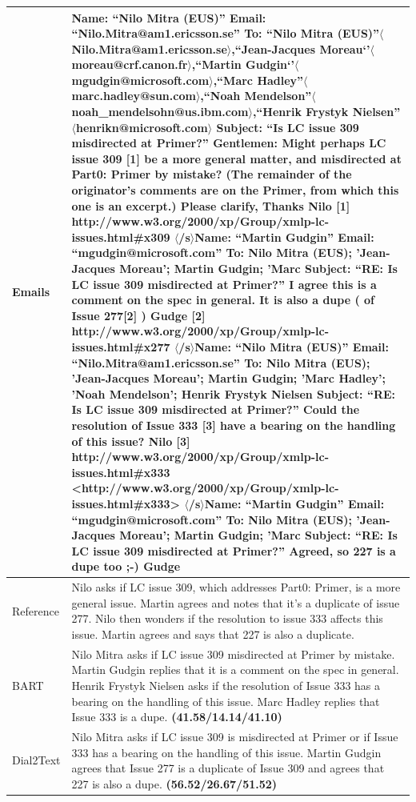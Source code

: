 \documentclass[letterpaper]{article} %
\begin{document}
\begin{table}
	\centering
	\small
	\begin{tabular}{p{1.5cm}p{14.5cm}}
		\toprule[1pt]
		Emails & Name: ``Nilo Mitra (EUS)''   Email: ``Nilo.Mitra@am1.ericsson.se''   To: ``Nilo Mitra (EUS)''$\langle$Nilo.Mitra@am1.ericsson.se$\rangle$,``Jean-Jacques Moreau‘’$\langle$moreau@crf.canon.fr$\rangle$,``Martin Gudgin‘’$\langle$mgudgin@microsoft.com$\rangle$,``Marc Hadley''$\langle$marc.hadley@sun.com$\rangle$,``Noah Mendelson''$\langle$noah\_mendelsohn@us.ibm.com$\rangle$,``Henrik Frystyk Nielsen''$\langle$henrikn@microsoft.com$\rangle$   Subject: ``Is LC issue 309 misdirected at Primer?''            Gentlemen:   Might perhaps LC issue 309 [1] be a more general matter, and misdirected at Part0: Primer by mistake? (The remainder of the originator's comments are on the Primer, from which this one is an excerpt.)   Please clarify,   Thanks   Nilo   [1] http://www.w3.org/2000/xp/Group/xmlp-lc-issues.html\#x309              $\langle$/s$\rangle$Name: ``Martin Gudgin''   Email: ``mgudgin@microsoft.com''   To: Nilo Mitra (EUS); 'Jean-Jacques Moreau'; Martin Gudgin; 'Marc   Subject: ``RE: Is LC issue 309 misdirected at Primer?''            I agree this is a comment on the spec in general. It is also a dupe ( of   Issue 277[2] )       Gudge       [2] http://www.w3.org/2000/xp/Group/xmlp-lc-issues.html\#x277    $\langle$/s$\rangle$Name: ``Nilo Mitra (EUS)''   Email: ``Nilo.Mitra@am1.ericsson.se''   To: Nilo Mitra (EUS); 'Jean-Jacques Moreau'; Martin Gudgin; 'Marc Hadley'; 'Noah Mendelson'; Henrik Frystyk Nielsen   Subject: ``RE: Is LC issue 309 misdirected at Primer?''            Could the resolution of Issue 333 [3] have a bearing on the handling of this issue?   Nilo   [3] http://www.w3.org/2000/xp/Group/xmlp-lc-issues.html\#x333 <http://www.w3.org/2000/xp/Group/xmlp-lc-issues.html\#x333>              $\langle$/s$\rangle$Name: ``Martin Gudgin''   Email: ``mgudgin@microsoft.com''   To: Nilo Mitra (EUS); 'Jean-Jacques Moreau'; Martin Gudgin; 'Marc   Subject: ``RE: Is LC issue 309 misdirected at Primer?''            Agreed, so 227 is a dupe too ;-)       Gudge\\
		\hline
		Reference & Nilo asks if LC issue 309, which addresses Part0: Primer, is a more general issue. Martin agrees and notes that it’s a duplicate of issue 277. Nilo then wonders if the resolution to issue 333 affects this issue. Martin agrees and says that 227 is also a duplicate.\\
		\hline
		BART & Nilo Mitra asks if LC issue 309 misdirected at Primer by mistake. Martin Gudgin replies that it is a comment on the spec in general. Henrik Frystyk Nielsen asks if the resolution of Issue 333 has a bearing on the handling of this issue. Marc Hadley replies that Issue 333 is a dupe. \textbf{(41.58/14.14/41.10)}\\
		\hline
		Dial2Text & Nilo Mitra asks if LC issue 309 is misdirected at Primer or if Issue 333 has a bearing on the handling of this issue. Martin Gudgin agrees that Issue 277 is a duplicate of Issue 309 and agrees that 227 is also a dupe. \textbf{(56.52/26.67/51.52)}\\		
		\bottomrule[1pt]
	\end{tabular}


\end{table}
\end{document}
